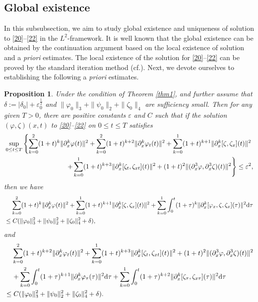 \documentclass[11pt]{article}
\theoremstyle{plain}
\newtheorem{proposition}{Proposition}[section]
\numberwithin{equation}{section}
\begin{document}
\subsection{Global existence}\label{s3.2}
In this subsubsection, we aim to study global existence and uniqueness of solution to \eqref{20}--\eqref{22} in the $L^2$-framework. 
It is well known that the global existence
can be obtained by the continuation argument based on the local existence of solution and a {\it priori}
estimates. The local existence of the solution for \eqref{20}--\eqref{22} can be proved by the standard iteration
method (cf.\cite{Nishida1978,ma1977}). Next, we devote ourselves to establishing the following a {\it priori} estimates.
	\begin{proposition}\label{p3.1}
		Under the condition of Theorem \ref{thm1},  and further assume that $\delta:=\left|\delta_{0}\right|+\varepsilon_0^{\frac{1}{2}}$ and $\|\varphi_{0}\|_{3}+\|\psi_{0}\|_{2}+\|\zeta_{0}\|_{4}$ are sufficiency small. 
		Then for any given $T>0$, there are positive constants $\varepsilon$ and $C$ such that if the solution $(\varphi, \zeta)(x, t)$ to \eqref{20}--\eqref{22} on $0\leq t\leq T$ satisfies
		\begin{align}\label{13.15}
		&\sup_{0\leq t\leq T}\left\{\sum_{k=0}^{2}(1+t)^{k}\|\partial_x^k\varphi(t)\|^2+\sum_{k=0}^{2}(1+t)^{k+2}\|\partial_x^k\varphi_t(t)\|^2+\sum_{k=0}^{1}(1+t)^{k+1}\|\partial_x^k[\zeta,\zeta_x](t)\|^2\notag\right.\\ 
		&\ \ \ \ \ \ \ \ \ \ \ \ \ \ \ \ \ \ \ \ \ \ \ \ \ \ \ \ \left.+\sum_{k=0}^{1}(1+t)^{k+3}\|\partial_x^k[\zeta_t,\zeta_{xt}](t)\|^2+(1+t)^{2}\|(\partial_x^3\varphi,\partial_x^3\zeta)(t)\|^2\right\}\leq \varepsilon^2,
		\end{align}
		then we have
		\begin{align}\label{13.16}
			&\;\;\;\;\sum_{k=0}^{2}(1+t)^{k}\|\partial_x^k\varphi(t)\|^2+\sum_{k=0}^{1}(1+t)^{k+1}\|\partial_x^k[\zeta,\zeta_x](t)\|^2+\sum_{k=0}^{1}\int_{0}^{t}(1+\tau)^k\|\partial_x^k[\varphi_x,\zeta,\zeta_x](\tau)\|^2{\rm d}\tau\notag\\
			&\leq C(\|\varphi_0\|_3^2+\|\psi_0\|_2^2+\|\zeta_0\|_4^2+\delta),
		\end{align}
		and
		\begin{align}\label{13.17}
			&\;\;\;\;\sum_{k=0}^{2}(1+t)^{k+2}\|\partial_x^k\varphi_t(t)\|^2+\sum_{k=0}^{1}(1+t)^{k+3}\|\partial_x^k[\zeta_t,\zeta_{xt}](t)\|^2+(1+t)^{2}\|(\partial_x^3\varphi,\partial_x^3\zeta)(t)\|^2\notag\\
			&\;\;\;\;+\sum_{k=0}^{2}\int_{0}^{t}(1+\tau)^{k+1}\|\partial_x^k\varphi_{\tau}(\tau)\|^2{\rm d}\tau+\sum_{k=0}^{1}\int_{0}^{t}(1+\tau)^{k+2}\|\partial_x^k[\zeta_{\tau},\zeta_{x\tau}](\tau)\|^2{\rm d}\tau\notag\\
			&\leq C(\|\varphi_0\|_3^2+\|\psi_0\|_2^2+\|\zeta_0\|_4^2+\delta).
		\end{align}
	\end{proposition}
\end{document}
